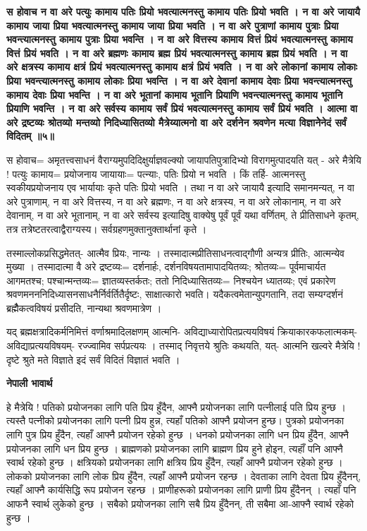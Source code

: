\documentclass[11pt, a5paper]{article}
\begin{document}
\textbf{स होवाच न वा अरे पत्युः कामाय पतिः प्रियो भवत्यात्मनस्तु कामाय पतिः प्रियो भवति । न वा अरे जायायै कामाय जाया प्रिया भवत्यात्मनस्तु कामाय जाया प्रिया भवति । न वा अरे पुत्राणां कामाय पुत्राः प्रिया भवन्त्यात्मनस्तु कामाय पुत्राः प्रिया भवन्ति । न वा अरे वित्तस्य कामाय वित्तं प्रियं भवत्यात्मनस्तु कामाय वित्तं प्रियं भवति । न वा अरे ब्रह्मणः कामाय ब्रह्म प्रियं भवत्यात्मनस्तु कामाय ब्रह्म प्रियं भवति । न वा अरे क्षत्रस्य कामाय क्षत्रं प्रियं भवत्यात्मनस्तु कामाय क्षत्रं प्रियं भवति । न वा अरे लोकानां कामाय लोकाः प्रिया भवन्त्यात्मनस्तु कामाय लोकाः प्रिया भवन्ति । न वा अरे देवानां कामाय देवाः प्रिया भवन्त्यात्मनस्तु कामाय देवाः प्रिया भवन्ति । न वा अरे भूतानां कामाय भूतानि प्रियाणि भवन्त्यात्मनस्तु कामाय भूतानि प्रियाणि भवन्ति । न वा अरे सर्वस्य कामाय सर्वं प्रियं भवत्यात्मनस्तु कामाय सर्वं प्रियं भवति । आत्मा वा अरे द्रष्टव्यः श्रोतव्यो मन्तव्यो निदिध्यासितव्यो मैत्रेय्यात्मनो वा अरे दर्शनेन श्रवणेन मत्या विज्ञानेेनेदं सर्वं विदितम् ॥५॥}

स होवाच= अमृतत्त्वसाधनं वैराग्यमुपदिदिक्षुर्याज्ञवल्क्यो जायापतिपुत्रादिभ्यो विरागमुत्पादयति यत् - अरे मैत्रेयि ! पत्युः कामाय= प्रयोजनाय जायायाः= पत्न्याः, पतिः प्रियो न भवति ।  किं तर्हि- आत्मनस्तु स्वकीयप्रयोजनाय एव भार्यायाः कृते पतिः प्रियो भवति । तथा न वा अरे जायायै इत्यादि समानमन्यत्, न वा अरे पुत्राणाम्, न वा अरे वित्तस्य, न वा अरे ब्रह्मणः, न वा अरे क्षत्रस्य, न वा अरे लोकानाम्, न वा अरे देवानाम्, न वा अरे भूतानाम्, न वा अरे सर्वस्य इत्यादिषु वाक्येषु पूर्वं पूर्वं यथा वर्णितम्, ते प्रीतिसाधने कृतम्, तत्र तत्रेष्टतरत्वाद्वैराग्यस्य। सर्वग्रहणमुक्तानुक्तार्थानां कृते ।

तस्माल्लोकप्रसिद्धमेतत्- आत्मैव प्रियः, नान्यः । तस्मादात्मप्रीतिसाधनत्वाद्गौणी अन्यत्र प्रीतिः, आत्मन्येव मुख्या । तस्मादात्मा वै अरे द्रष्टव्यः= दर्शनार्हः, दर्शनविषयतामापादयितव्यः; श्रोतव्यः= पूर्वमाचार्यत आगमतश्च; पश्चान्मन्तव्यः= ज्ञातव्यस्तर्कतः; ततो निदिध्यासितव्यः= निश्चयेन ध्यातव्यः; एवं प्रकारेण श्रवणमनननिदिध्यासनसाधनैर्निर्वर्तितैर्दृष्टः, साक्षात्कारो भवति। यदैकत्वमेतान्युपगतानि, तदा सम्यग्दर्शनं ब्रह्मैैकत्वविषयं प्रसीदति, नान्यथा श्रवणमात्रेण ।

यद् ब्रह्मक्षत्रादिकर्मनिमित्तं वर्णाश्रमादिलक्षणम् आत्मनि- अविद्याध्यारोपितप्रत्ययविषयं क्रियाकारकफलात्मकम्- अविद्याप्रत्ययविषयम्- रज्ज्वामिव सर्पप्रत्ययः । तस्माद् निवृत्तये श्रुतिः कथयति, यत्- आत्मनि खल्वरे मैत्रेयि ! दृष्टे श्रुते मते विज्ञाते इदं सर्वं विदितं विज्ञातं भवति ।

\textbf{नेपाली भावार्थ}

हे मैत्रेयि ! पतिको प्रयोजनका लागि पति प्रिय हुँदैन, आफ्नै प्रयोजनका लागि पत्नीलाई पति प्रिय हुन्छ । त्यस्तै पत्नीको प्रयोजनका लागि पत्नी प्रिय हुन्न, त्यहाँ पतिको आफ्नै प्रयोजन हुन्छ। पुत्रको प्रयोजनका लागि पुत्र प्रिय हुँदैन, त्यहाँ आफ्नै प्रयोजन रहेको हुन्छ । धनको प्रयोजनका लागि धन प्रिय हुँदैन, आफ्नै प्रयोजनका लागि धन प्रिय हुन्छ । ब्राह्मणको प्रयोजनका लागि ब्राह्मण प्रिय हुने होइन, त्यहाँं पनि आफ्नै स्वार्थ रहेको हुन्छ । क्षत्रियको प्रयोजनका लागि क्षत्रिय प्रिय हुँदैन, त्यहाँ आफ्नै प्रयोजन रहेको हुन्छ । लोकको प्रयोजनका लागि लोक प्रिय हुँदैन, त्यहाँ आफ्नै प्रयोजन रहन्छ । देवताका लागि देवता प्रिय हुँदैनन्, त्यहाँ आफ्नै कार्यसिद्धि रूप प्रयोजन रहन्छ । प्राणीहरूको प्रयोजनका लागि प्राणी प्रिय हुँदैनन् । त्यहाँ पनि आफनै स्वार्थ लुकेको हुन्छ । सबैको प्रयोजनका लागि सबै प्रिय हुँदैनन्, ती सबैमा आ-आफ्नै स्वार्थ रहेको हुन्छ ।
\end{document}
